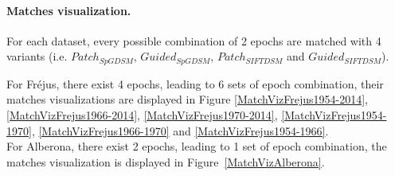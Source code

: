 \paragraph{Matches visualization.}
\label{matchVizMainBody}
For each dataset, every possible combination of 2 epochs are matched with 4 variants (i.e.  $Patch_{SpGDSM}$,  $Guided_{SpGDSM}$,  $Patch_{SIFTDSM}$ and  $Guided_{SIFTDSM}$). 

For Fr{\'e}jus, there exist 4 epochs, leading to 6 sets of epoch combination, their matches visualizations are displayed in Figure \ref{MatchVizFrejus1954-2014}, \ref{MatchVizFrejus1966-2014}, \ref{MatchVizFrejus1970-2014}, \ref{MatchVizFrejus1954-1970}, \ref{MatchVizFrejus1966-1970} and \ref{MatchVizFrejus1954-1966}.\\
For Alberona, there exist 2 epochs, leading to 1 set of epoch combination, the matches visualization is displayed in Figure~\ref{MatchVizAlberona}.\\


